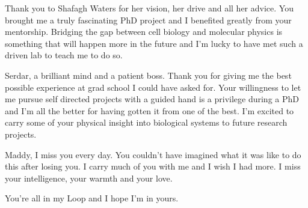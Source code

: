 Thank you to Shafagh Waters for her vision, her drive and all her advice. You brought me a truly fascinating PhD project and I benefited greatly from your mentorship. Bridging the gap between cell biology and molecular physics is something that will happen more in the future and I'm lucky to have met such a driven lab to teach me to do so. 

Serdar, a brilliant mind and a patient boss. Thank you for giving me the best possible experience at grad school I could have asked for. Your willingness to let me pursue self directed projects with a guided hand is a privilege during a PhD and I'm all the better for having gotten it from one of the best. I'm excited to carry some of your physical insight into biological systems to future research projects. 

Maddy, I miss you every day. You couldn't have imagined what it was like to do this after losing you. I carry much of you with me and I wish I had more. I miss your intelligence, your warmth and your love.

You're all in my Loop and I hope I'm in yours.

